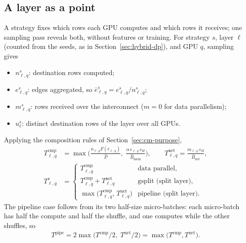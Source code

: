 \subsection{A layer as a point}
\label{sec:cm-point}

A strategy fixes which rows each GPU computes and which rows it receives; one sampling pass
reveals both, without features or training. For strategy $s$, layer $\ell$ (counted from the
seeds, as in Section~\ref{sec:hybrid-dp}), and GPU $q$, sampling gives
\begin{itemize}\itemsep1pt
  \item $n^{s}_{\ell,q}$: destination rows computed;
  \item $e^{s}_{\ell,q}$: edges aggregated, so $\bar{e}^{s}_{\ell,q} = e^{s}_{\ell,q}/n^{s}_{\ell,q}$;
  \item $m^{s}_{\ell,q}$: rows received over the interconnect ($m = 0$ for data parallelism);
  \item $u^{s}_{\ell}$: distinct destination rows of the layer over all GPUs.
\end{itemize}

Applying the composition rules of Section~\ref{sec:cm-purpose},
\begin{align}
  T^{\mathrm{cmp}}_{\ell,q} &= \max\!\Big(\frac{n_{\ell,q} F(\bar{e}_{\ell,q})}{\hat{P}},\;
       \frac{\alpha\, e_{\ell,q}\, s_H}{\hat{B}_{\mathrm{mem}}}\Big), \qquad
  T^{\mathrm{net}}_{\ell,q} = \frac{m_{\ell,q}\, s_H}{\hat{B}_{\mathrm{net}}},
  \label{eq:cm-gpu-parts}\\
  T^{s}_{\ell,q} &= \begin{cases}
     T^{\mathrm{cmp}}_{\ell,q} & \text{data parallel},\\
     T^{\mathrm{cmp}}_{\ell,q} + T^{\mathrm{net}}_{\ell,q} & \text{gsplit (split layer)},\\
     \max\!\big(T^{\mathrm{cmp}}_{\ell,q},\, T^{\mathrm{net}}_{\ell,q}\big) & \text{pipeline (split layer)}.
  \end{cases}
  \label{eq:cm-gpu-time}
\end{align}
The pipeline case follows from its two half-size micro-batches: each micro-batch has half the
compute and half the shuffle, and one computes while the other shuffles, so
\[
  T^{\mathrm{pipe}} = 2\max\!\big(T^{\mathrm{cmp}}/2,\; T^{\mathrm{net}}/2\big)
  = \max\!\big(T^{\mathrm{cmp}}, T^{\mathrm{net}}\big).
\]

